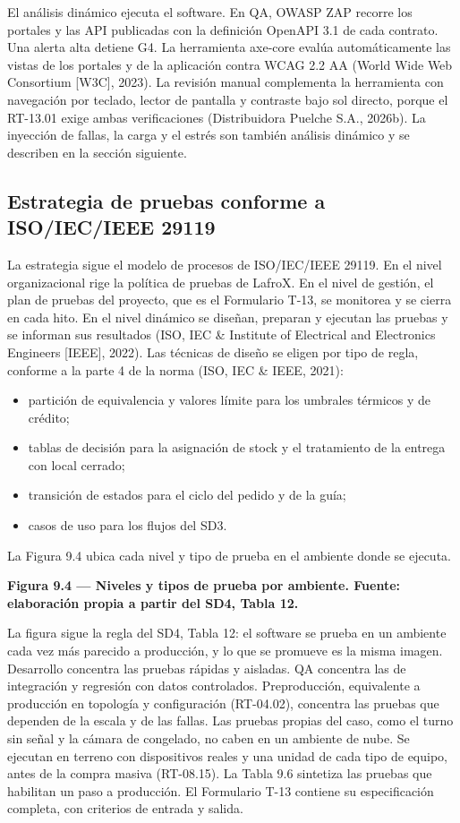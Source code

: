 El análisis dinámico ejecuta el software. En QA, OWASP ZAP recorre los portales y las API publicadas con la definición OpenAPI 3.1 de cada contrato. Una alerta alta detiene G4. La herramienta axe-core evalúa automáticamente las vistas de los portales y de la aplicación contra WCAG 2.2 AA (World Wide Web Consortium [W3C], 2023). La revisión manual complementa la herramienta con navegación por teclado, lector de pantalla y contraste bajo sol directo, porque el RT-13.01 exige ambas verificaciones (Distribuidora Puelche S.A., 2026b). La inyección de fallas, la carga y el estrés son también análisis dinámico y se describen en la sección siguiente.

\subsection{Estrategia de pruebas conforme a ISO/IEC/IEEE 29119}

La estrategia sigue el modelo de procesos de ISO/IEC/IEEE 29119. En el nivel organizacional rige la política de pruebas de LafroX. En el nivel de gestión, el plan de pruebas del proyecto, que es el Formulario T-13, se monitorea y se cierra en cada hito. En el nivel dinámico se diseñan, preparan y ejecutan las pruebas y se informan sus resultados (ISO, IEC \& Institute of Electrical and Electronics Engineers [IEEE], 2022). Las técnicas de diseño se eligen por tipo de regla, conforme a la parte 4 de la norma (ISO, IEC \& IEEE, 2021):

\begin{itemize}
\item partición de equivalencia y valores límite para los umbrales térmicos y de crédito;
\item tablas de decisión para la asignación de stock y el tratamiento de la entrega con local cerrado;
\item transición de estados para el ciclo del pedido y de la guía;
\item casos de uso para los flujos del SD3.
\end{itemize}

La Figura 9.4 ubica cada nivel y tipo de prueba en el ambiente donde se ejecuta.



\textbf{Figura 9.4 — Niveles y tipos de prueba por ambiente. Fuente: elaboración propia a partir del SD4, Tabla 12.}

La figura sigue la regla del SD4, Tabla 12: el software se prueba en un ambiente cada vez más parecido a producción, y lo que se promueve es la misma imagen. Desarrollo concentra las pruebas rápidas y aisladas. QA concentra las de integración y regresión con datos controlados. Preproducción, equivalente a producción en topología y configuración (RT-04.02), concentra las pruebas que dependen de la escala y de las fallas. Las pruebas propias del caso, como el turno sin señal y la cámara de congelado, no caben en un ambiente de nube. Se ejecutan en terreno con dispositivos reales y una unidad de cada tipo de equipo, antes de la compra masiva (RT-08.15). La Tabla 9.6 sintetiza las pruebas que habilitan un paso a producción. El Formulario T-13 contiene su especificación completa, con criterios de entrada y salida.

